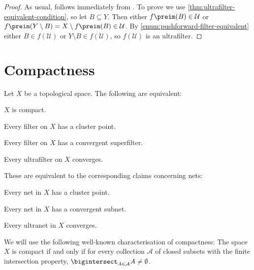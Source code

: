 \documentclass[article, a4paper, 11pt, oneside]{memoir}
\numberwithin{equation}{chapter}
\newcommand{\calU}{\mathcal{U}}
\newcommand{\calA}{\mathcal{A}}
\theoremstyle{nonumberplain}
\begin{document}
\begin{proof}
    As usual,  follows immediately from . To prove  we use \cref{thm:ultrafilter-equivalent-condition}, so let $B \subseteq Y$. Then either $f\preim(B) \in \calU$ or $f\preim(Y \setminus B) = X \setminus f\preim(B) \in \calU$. By \cref{enum:pushforward-filter-equivalent} either $B \in f(\calU)$ or $Y \setminus B \in f(\calU)$, so $f(\calU)$ is an ultrafilter.
\end{proof}


\chapter{Compactness}

\newcommand{\calK}{\mathcal{K}}

\begin{proposition}
    \label{thm:compactness-equivalent}
    Let $X$ be a topological space. The following are equivalent:
    \begin{enumprop}
        \item \label{enum:space-compact} $X$ is compact.
        \item \label{enum:every-filter-cluster} Every filter on $X$ has a cluster point.
        \item \label{enum:every-filter-convergent-superfilter} Every filter on $X$ has a convergent superfilter.
        \item \label{enum:every-ultrafilter-converges} Every ultrafilter on $X$ converges.
    \end{enumprop}
    These are equivalent to the corresponding claims concerning nets:
    \begin{enumprop}[resume]
        \item Every net in $X$ has a cluster point.
        \item Every net in $X$ has a convergent subnet.
        \item Every ultranet in $X$ converges.
    \end{enumprop}
\end{proposition}
%
We will use the following well-known characterisation of compactness: The space $X$ is compact if and only if for every collection $\calA$ of closed subsets with the finite intersection property, $\bigintersect_{A \in \calA} A \neq \emptyset$.
\end{document}
